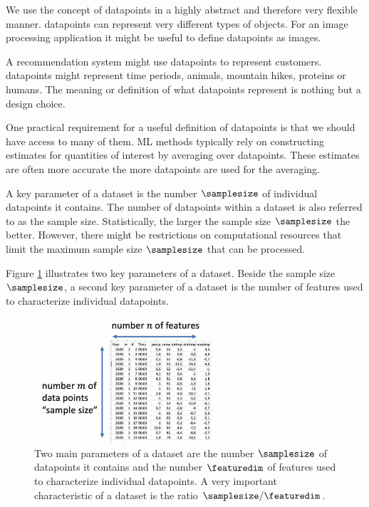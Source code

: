 \documentclass[12pt]{report}
\begin{document}
We use the concept of datapoints in a highly abstract and 
therefore very flexible manner. datapoints can represent 
very different types of objects. For an image processing 
application it might be useful to define datapoints as images. 

A recommendation system might use datapoints to represent 
customers.  datapoints might represent time periods, animals, 
mountain hikes, proteins or humans. The meaning or definition 
of what datapoints represent is nothing but a design choice. 
 
One practical requirement for a useful definition of datapoints is 
that we should have access to many of them. ML methods typically 
rely on constructing estimates for quantities of interest by averaging 
over datapoints. These estimates are often more accurate the more 
datapoints are used for the averaging. 

A key parameter of a dataset is the number $\samplesize$ of individual 
datapoints it contains. The number of datapoints within a dataset is 
also referred to as the sample size. Statistically, the larger the sample size $\samplesize$ 
the better. However, there might be restrictions on computational 
resources that limit the maximum sample size $\samplesize$ that can be 
processed. 

Figure \ref{fig:two_main_parameters} illustrates two key 
parameters of a dataset. Beside the sample size $\samplesize$, a second 
key parameter of a dataset is the number of features used to characterize 
individual datapoints. 

\begin{figure}[htbp]
	\centering
	\includegraphics[width=7cm]{DataSet.jpg}
	\caption{Two main parameters of a dataset are the number 
		$\samplesize$ of datapoints it contains and the number 
		$\featuredim$ of features used to characterize individual 
		datapoints. A very important characteristic of a dataset 
		is the ratio $\samplesize/\featuredim$. }
	\label{fig:two_main_parameters}
\end{figure}
\end{document}
